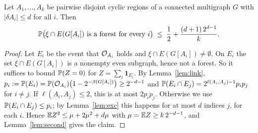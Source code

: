 \begin{lemma}\label{lem:smallcuts}
Let $A_1,\dots,A_k$ be pairwise disjoint cyclic regions of a connected multigraph $G$ with
$|\delta A_i|\le d$ for all $i$. Then
\[
  \mathbb{P}\bigl(\xi\cap E(G[A_i])\text{ is a forest for every }i\bigr)\;\le\;\frac12+\frac{(d+1)\,2^{d-1}}{k}.
\]
\end{lemma}

\begin{proof}
Let $E_i$ be the event that $\mathcal{O}_{A_i}$ holds and $\xi\cap E(G[A_i])\ne\emptyset$. On $E_i$ the set
$\xi\cap E(G[A_i])$ is a nonempty even subgraph, hence not a forest. So it suffices to bound
$\mathbb{P}(Z=0)$ for $Z=\sum_i\mathbf{1}_{E_i}$. By Lemma~\ref{lem:link},
$p_i:=\mathbb{P}(E_i)=\mathbb{P}(\mathcal{O}_{A_i})\bigl(1-2^{-\beta(G[A_i])}\bigr)\ge2^{-d-1}$ and
$\mathbb{P}(E_i\cap E_j)=2^{\ell(A_i,A_j)-1}p_ip_j$ for $i\ne j$. If $\ell(A_i,A_j)\le2$, this is at most
$2p_ip_j$. Otherwise we use $\mathbb{P}(E_i\cap E_j)\le p_i$; by Lemma~\ref{lem:exc} this happens for at
most $d$ indices $j$, for each $i$. Hence $\mathbb{E} Z^{2}\le\mu+2\mu^{2}+d\mu$ with
$\mu=\mathbb{E} Z\ge k\,2^{-d-1}$, and Lemma~\ref{lem:second} gives the claim.
\end{proof}
